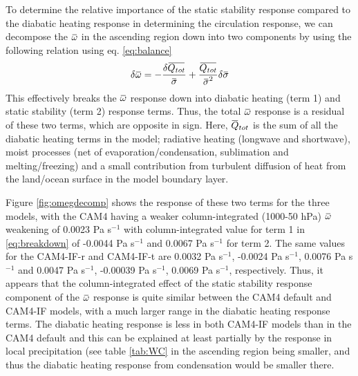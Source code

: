\documentclass[letterpaper,12pt,titlepage,oneside,final]{book}
\newcommand{\overbar}[1]{\mkern 1.5mu\overline{\mkern-1.5mu#1\mkern-1.5mu}\mkern 1.5mu}
\begin{document}
To determine the relative importance of the static stability response compared to the diabatic heating response in determining the circulation response, we can decompose the $\overbar{\omega}$ in the ascending region down into two components by using the following relation using eq. \ref{eq:balance} \citep{yanai_determination_1973,li_strengthening_2015} 
\begin{align}\label{eq:breakdown}
\delta{\overbar{\omega}}=-\frac{\delta{\overbar{Q_{tot}}}}{\overbar{\sigma}}+\frac{\overbar{Q_{tot}}}{{\overbar{\sigma}}^{2}}\delta{\overbar{\sigma}}
\end{align}
This effectively breaks the $\overbar{\omega}$ response down into diabatic heating (term 1) and static stability (term 2) response terms. Thus, the total $\overbar{\omega}$ response is a residual of these two terms, which are opposite in sign. Here, $\overbar{Q}_{tot}$ is the sum of all the diabatic heating terms in the model; radiative heating (longwave and shortwave), moist processes (net of evaporation/condensation, sublimation and melting/freezing) and a small contribution from turbulent diffusion of heat from the land/ocean surface in the model boundary layer.  


Figure \ref{fig:omegdecomp} shows the response of these two terms for the three models, with the CAM4 having a weaker column-integrated (1000-50 hPa) $\overbar{\omega}$ weakening of 0.0023 Pa s$^{-1}$ with column-integrated value for term 1 in \ref{eq:breakdown} of -0.0044 Pa s$^{-1}$ and 0.0067 Pa s$^{-1}$ for term 2. The same values for the CAM4-IF-r and CAM4-IF-t are 0.0032 Pa s$^{-1}$, -0.0024 Pa s$^{-1}$, 0.0076 Pa s$^{-1}$ and 0.0047 Pa s$^{-1}$, -0.00039 Pa s$^{-1}$, 0.0069 Pa s$^{-1}$, respectively. Thus, it appears that the column-integrated effect of the static stability response component of the $\overbar{\omega}$ response is quite similar between the CAM4 default and CAM4-IF models, with a much larger range in the diabatic heating response terms. The diabatic heating response is less in both CAM4-IF models than in the CAM4 default and this can be explained at least partially by the response in local precipitation (see table \ref{tab:WC} in the ascending region being smaller, and thus the diabatic heating response from condensation would be smaller there.
\end{document}
